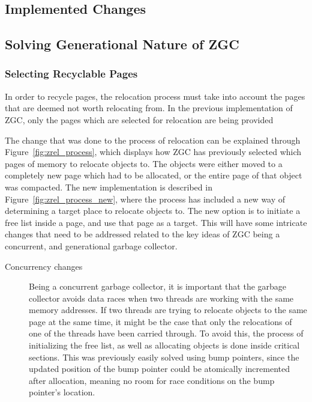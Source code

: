 \subsection{Implemented Changes}




\subsection{Solving Generational Nature of ZGC}
\subsubsection{Selecting Recyclable Pages}
In order to recycle pages, the relocation process must take into account the pages that are deemed not worth relocating from. In the previous implementation of ZGC, only the pages which are selected for relocation are being provided

The change that was done to the process of relocation can be explained through Figure~\ref{fig:zrel_process}, which displays how ZGC has previously selected which pages of memory to relocate objects to. The objects were either moved to a completely new page which had to be allocated, or the entire page of that object was compacted. The new implementation is described in Figure~\ref*{fig:zrel_process_new}, where the process has included a new way of determining a target place to relocate objects to. The new option is to initiate a free list inside a page, and use that page as a target. This will have some intricate changes that need to be addressed related to the key ideas of ZGC being a concurrent, and generational garbage collector.
\begin{description}
    \item[Concurrency changes] Being a concurrent garbage collector, it is important that the garbage collector avoids data races when two threads are working with the same memory addresses. If two threads are trying to relocate objects to the same page at the same time, it might be the case that only the relocations of one of the threads have been carried through. To avoid this, the process of initializing the free list, as well as allocating objects is done inside critical sections. This was previously easily solved using bump pointers, since the updated position of the bump pointer could be atomically incremented after allocation, meaning no room for race conditions on the bump pointer's location.
\end{description}

